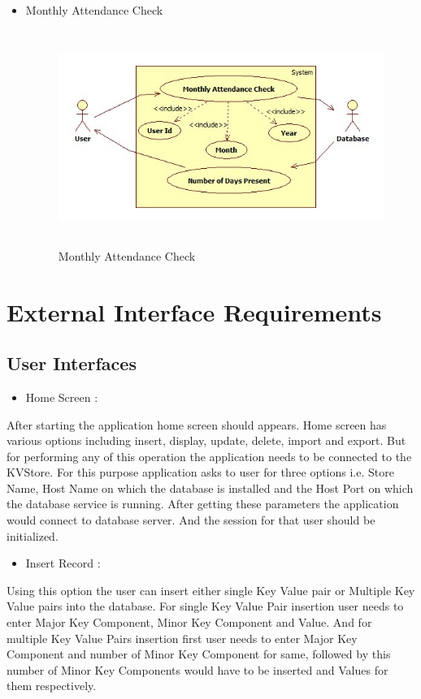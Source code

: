\newpage
\begin{itemize}
  \item Monthly Attendance Check
\begin{figure}[h]
\centering
  \includegraphics[width=11.5cm,height=7cm]{Fig8.jpg}
  \caption{Monthly Attendance Check}\label{Monthly Attendance Check}
\end{figure}
\end{itemize}

\section{External Interface Requirements}
\subsection{User Interfaces}
\begin{itemize}
  \item Home Screen :
\end{itemize}
After starting the application home screen should appears. Home screen has various options including insert, display, update, delete, import and export. But for performing any of this operation the application needs to be connected to the KVStore. For this purpose application asks to user for three options i.e. Store Name, Host Name on which the database is installed and the Host Port on which the database service is running. After getting these parameters the application would connect to database server. And the session for that user should be initialized.

\begin{itemize}
  \item Insert Record :
\end{itemize}
Using this option the user can insert either single Key Value pair or Multiple Key Value pairs into the database. For single Key Value Pair insertion user needs to enter Major Key Component, Minor Key Component and Value. And for multiple Key Value Pairs insertion first user needs to enter Major Key Component and number of Minor Key Component for same, followed by this number of Minor Key Components would have to be inserted and Values for them respectively.

